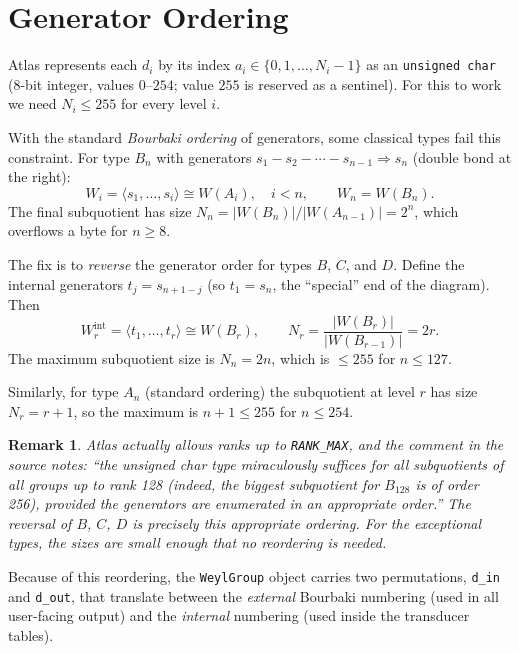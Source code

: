 \documentclass[12pt]{amsart}
\newtheorem{remark}[theorem]{Remark}
\begin{document}
\section{Generator Ordering}\label{sec:ordering}

Atlas represents each $d_i$ by its index $a_i \in \{0, 1, \ldots, N_i - 1\}$
as an \texttt{unsigned char} (8-bit integer, values $0$--$254$; value $255$ is
reserved as a sentinel).  For this to work we need $N_i \leq 255$ for every
level $i$.

With the standard \emph{Bourbaki ordering} of generators, some classical types
fail this constraint.  For type $B_n$ with generators
$s_1 - s_2 - \cdots - s_{n-1} \Rightarrow s_n$ (double bond at the right):
\[
  W_i = \langle s_1, \ldots, s_i \rangle \cong W(A_i), \quad i < n,
  \qquad
  W_n = W(B_n).
\]
The final subquotient has size $N_n = |W(B_n)| / |W(A_{n-1})| = 2^n$, which
overflows a byte for $n \geq 8$.

The fix is to \emph{reverse} the generator order for types $B$, $C$, and $D$.
Define the internal generators $t_j = s_{n+1-j}$ (so $t_1 = s_n$, the
``special'' end of the diagram).  Then
\[
  W_r^{\mathrm{int}} = \langle t_1, \ldots, t_r \rangle \cong W(B_r),
  \qquad
  N_r = \frac{|W(B_r)|}{|W(B_{r-1})|} = 2r.
\]
The maximum subquotient size is $N_n = 2n$, which is $\leq 255$ for $n \leq
127$.

Similarly, for type $A_n$ (standard ordering) the subquotient at level $r$ has
size $N_r = r + 1$, so the maximum is $n+1 \leq 255$ for $n \leq 254$.

\begin{remark}
Atlas actually allows ranks up to \texttt{RANK\_MAX}, and the comment in the
source notes: ``the unsigned char type miraculously suffices for all subquotients
of all groups up to rank 128 (indeed, the biggest subquotient for $B_{128}$ is
of order 256), \emph{provided} the generators are enumerated in an appropriate
order.''  The reversal of $B$, $C$, $D$ is precisely this appropriate ordering.
For the exceptional types, the sizes are small enough that no reordering is
needed.
\end{remark}

Because of this reordering, the \texttt{WeylGroup} object carries two
permutations, \texttt{d\_in} and \texttt{d\_out}, that translate between the
\emph{external} Bourbaki numbering (used in all user-facing output) and the
\emph{internal} numbering (used inside the transducer tables).
\end{document}
